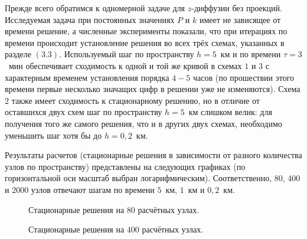 \documentclass[14pt, a4paper, fleqn]{extarticle}
\begin{document}
Прежде всего обратимся к одномерной задаче для $z$-диффузии без проекций. Исследуемая задача при постоянных значениях $P$ и $k$ имеет не зависящее от времени решение, а численные эксперименты показали, что при итерациях по времени происходит установление решения во всех трёх схемах, указанных в разделе $(3.3)$. Используемый шаг по пространству $h = 5$~км и по времени $\tau = 3$~мин обеспечивает сходимость к одной и той же кривой в схемах $1$ и $3$ с характерным временем установления порядка $4-5$ часов (по прошествии этого времени первые несколько значащих цифр в решении уже не изменяются). Схема $2$ также имеет сходимость к стационарному решению, но в отличие от оставшихся двух схем шаг по пространству $h=5$~км слишком велик: для получения того же самого решения, что и в других двух схемах, необходимо уменьшить шаг хотя бы до $h = 0{,}2$~км.

Результаты расчетов (стационарные решения в зависимости от разного количества узлов по пространству) представлены на следующих графиках (по горизонтальной оси масштаб выбран логарифмическим). Соответственно, $80$, $400$ и $2000$ узлов отвечают шагам по времени $5$~км, $1$~км и $0{,}2$~км.
 
\begin{figure}[H]
\caption{Стационарные решения на $80$ расчётных узлах.}
\end{figure}

\begin{figure}[H]
\caption{Стационарные решения на $400$ расчётных узлах.}
\end{figure}
\end{document}
